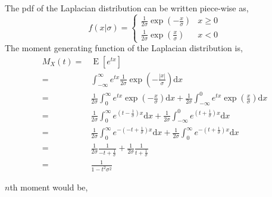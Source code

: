 \documentclass[addpoints]{exam}
\theoremstyle{mytheoremstyle}
\theoremstyle{mytheoremstyle}
\theoremstyle{myproblemstyle}
\begin{document}
\begin{questions}
\begin{parts}
		\begin{solution}
			The pdf of the Laplacian distribution can be written piece-wise as,
			\[
				f(x|\sigma)=\begin{cases}
					\frac{1}{2\sigma}\exp{\left(-\frac{x}{\sigma}\right)} & x \ge 0 \\
					\frac{1}{2\sigma}\exp{\left(\frac{x}{\sigma}\right)}  & x < 0
				\end{cases}
			\]
			The moment generating function of the Laplacian distribution is,
			\begin{align*}
				M_{X}(t)= & \operatorname{E}\left[e^{tx}\right]                                                                                                                                                 \\
				=         & \int_{-\infty}^{\infty} e^{tx}\frac{1}{2\sigma}\exp{\left(-\frac{|x|}{\sigma}\right)}\mathrm{d} x                                                                                   \\
				=         & \frac{1}{2\sigma}\int_{0}^{\infty} e^{tx}\exp{\left(-\frac{x}{\sigma}\right)}\mathrm{d} x+\frac{1}{2\sigma}\int_{-\infty}^{0} e^{tx}\exp{\left(\frac{x}{\sigma}\right)}\mathrm{d} x \\
				=         & \frac{1}{2\sigma}\int_{0}^{\infty} e^{\left(t-\frac{1}{\sigma}\right)x}\mathrm{d} x+\frac{1}{2\sigma}\int_{-\infty}^{0} e^{\left(t+\frac{1}{\sigma}\right)x}\mathrm{d} x            \\
				=         & \frac{1}{2\sigma}\int_{0}^{\infty} e^{-\left(-t+\frac{1}{\sigma}\right)x}\mathrm{d} x+\frac{1}{2\sigma}\int_{0}^{\infty} e^{-\left(t+\frac{1}{\sigma}\right)x}\mathrm{d} x          \\
				=         & \frac{1}{2\sigma}\frac{1}{-t+\frac{1}{\sigma}}+\frac{1}{2\sigma}\frac{1}{t+\frac{1}{\sigma}}                                                                                        \\
				=         & \frac{1}{1-t^2\sigma^2}
			\end{align*}

			\(n\)th moment would be,


\end{solution}
\end{parts}
\end{questions}
\end{document}
